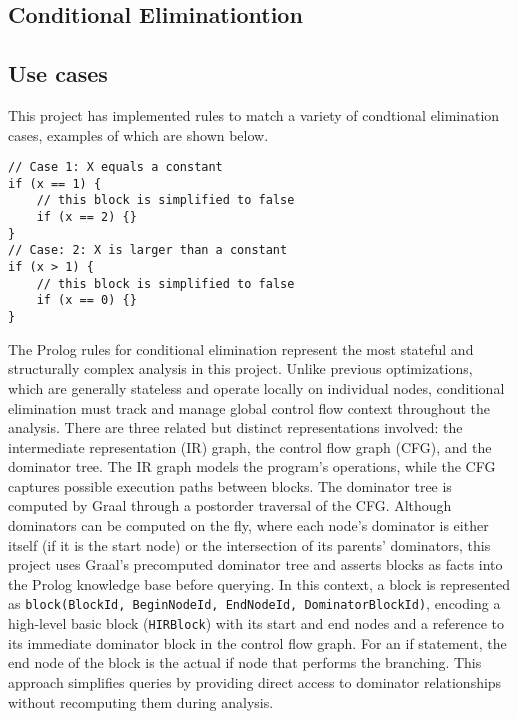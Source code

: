 \subsection{Conditional Eliminationtion}
\subsection*{Use cases}
This project has implemented rules to match a variety of condtional elimination cases, examples of which are shown below.
\smallbreak

\begin{lstlisting}
// Case 1: X equals a constant
if (x == 1) {
    // this block is simplified to false
    if (x == 2) {}
}
// Case: 2: X is larger than a constant
if (x > 1) {
    // this block is simplified to false
    if (x == 0) {}
}
\end{lstlisting}

The Prolog rules for conditional elimination represent the most stateful and structurally complex analysis in this project. Unlike previous optimizations, which are generally stateless and operate locally on individual nodes, conditional elimination must track and manage global control flow context throughout the analysis. There are three related but distinct representations involved: the intermediate representation (IR) graph, the control flow graph (CFG), and the dominator tree. The IR graph models the program’s operations, while the CFG captures possible execution paths between blocks. The dominator tree is computed by Graal through a postorder traversal of the CFG. Although dominators can be computed on the fly, where each node’s dominator is either itself (if it is the start node) or the intersection of its parents’ dominators, this project uses Graal’s precomputed dominator tree and asserts blocks as facts into the Prolog knowledge base before querying. In this context, a block is represented as \texttt{block(BlockId, BeginNodeId, EndNodeId, DominatorBlockId)}, encoding a high-level basic block (\texttt{HIRBlock}) with its start and end nodes and a reference to its immediate dominator block in the control flow graph. For an if statement, the end node of the block is the actual if node that performs the branching. This approach simplifies queries by providing direct access to dominator relationships without recomputing them during analysis.

